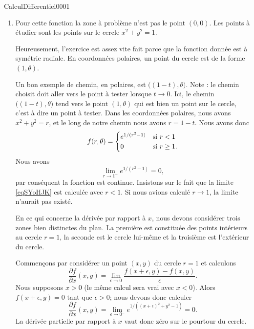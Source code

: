 \begin{corrige}{CalculDifferentiel0001}
\begin{enumerate}
		\item
			Pour cette fonction la zone à problème n'est pas le point $(0,0)$. Les points à étudier sont les points sur le cercle $x^2+y^2=1$.

			Heureusement, l'exercice est assez vite fait parce que la fonction donnée est à symétrie radiale. En coordonnées polaires, un point du cercle est de la forme $(1,\theta)$. 
            
            Un bon exemple de chemin, en polaires, est $\big( (1-t),\theta \big)$. Note : le chemin choisit doit aller vers le point à tester lorsque $t\to 0$. Ici, le chemin $\big( (1-t),\theta \big)$ tend vers le point $(1,\theta)$ qui est bien un point sur le cercle, c'est à dire un point à tester. Dans les coordonnées polaires, nous avons $x^2+y^2=r$, et le long de notre chemin nous avons $r=1-t$. Nous avons donc
			\begin{equation}
                f(r,\theta)= \begin{cases}
                    e^{1/(r^2-1)}    &   \text{si \( r<1\)}\\
                    0    &    \text{si \( r\geq 1\)}.
                \end{cases}
			\end{equation}
            Nous avons
            \begin{equation}        \label{eqSYoHJK}
                \lim_{r\to 1^-} e^{1/(r^2-1)}=0,
            \end{equation}
            par conséquent la fonction est continue. Insistons sur le fait que la limite \eqref{eqSYoHJK} est calculée avec \( r<1\). Si nous avions calculé \( r\to 1\), la limite n'aurait pas existé.

            En ce qui concerne la dérivée par rapport à \( x\), nous devons considérer trois zones bien distinctes du plan. La première est constituée des points intérieurs au cercle \( r=1\), la seconde est le cercle lui-même et la troisième est l'extérieur du cercle.
            
            Commençons par considérer un point \( (x,y)\) du cercle \( r=1\) et calculons
            \begin{equation}
                \frac{ \partial f }{ \partial x }(x,y)=\lim_{\epsilon\to 0}\frac{ f(x+\epsilon,y)-f(x,y) }{ \epsilon }.
            \end{equation}
            Nous supposons \( x>0\) (le même calcul sera vrai avec \( x<0\)). Alors \( f(x+\epsilon,y)=0\) tant que \( \epsilon>0\); nous devons donc calculer
            \begin{equation}
                \frac{ \partial f }{ \partial x }(x,y)=\lim_{\epsilon\to 0^-} e^{1/((x+\epsilon)^2+y^2-1 )}=0.
            \end{equation}
            La dérivée partielle par rapport à \( x\) vaut donc zéro sur le pourtour du cercle. 
            

\end{enumerate}
\end{corrige}
